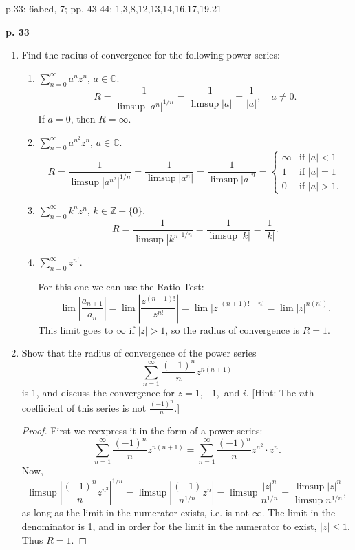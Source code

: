 \documentclass[11pt,oneside,english]{amsart}
\theoremstyle{definition}
\newcommand{\lspace}{\vspace{5mm}}
\newcommand{\MB}[1]{\mathbb{#1}}
\begin{document}
\rightline{\today}

\lspace

p.33: 6abcd, 7; pp. 43-44: 1,3,8,12,13,14,16,17,19,21


\textbf{p. 33}


\begin{enumerate}[leftmargin=*]
\itemsep5mm
\setcounter{enumi}{5}


\item Find the radius of convergence for the following power series:

\begin{enumerate}

\itemsep5mm
\item $\displaystyle \sum_{n=0}^\infty a^nz^n$, $a\in \MB{C}$.
\[
R=\frac{1}{\limsup|a^n|^{1/n}}=\frac{1}{\limsup|a|}=\frac{1}{|a|},\quad a\neq0.
\]
If $a=0$, then $R=\infty$.

\item $\displaystyle \sum_{n=0}^\infty a^{n^2}z^n$, $a\in \MB{C}$.
\[
R=\frac{1}{\limsup|a^{n^2}|^{1/n}}=\frac{1}{\limsup|a^n|}=\frac{1}{\limsup|a|^n}=\begin{cases}\infty & \text{if }|a|<1\\ 1 & \text{if }|a|=1\\ 0 & \text{if }|a|>1.\end{cases}
\]

\item $\displaystyle \sum_{n=0}^\infty k^{n}z^n$, $k\in\MB{Z}-\{0\}$.
\[
R=\frac{1}{\limsup|k^n|^{1/n}}=\frac{1}{\limsup|k|}=\frac{1}{|k|}.
\]

\item $\displaystyle \sum_{n=0}^\infty z^{n!}$.

For this one we can use the Ratio Test:
\[
\lim\left|\frac{a_{n+1}}{a_n}\right|=\lim\left|\frac{z^{(n+1)!}}{z^{n!}}\right|=\lim |z|^{(n+1)!-n!}=\lim |z|^{n(n!)}.
\]
This limit goes to $\infty$ if $|z|>1$, so the radius of convergence is $R=1$.
\end{enumerate}

\pagebreak
\item Show that the radius of convergence of the power series 
\[
\sum_{n=1}^\infty\frac{(-1)^n}{n}z^{n(n+1)}
\]
is 1, and discuss the convergence for $z=1, -1,$ and $i$. [Hint: The $n$th coefficient of this series is not $\frac{(-1)^n}{n}$.]

\begin{proof}
First we reexpress it in the form of a power series:
\[
\sum_{n=1}^\infty\frac{(-1)^n}{n}z^{n(n+1)}=\sum_{n=1}^\infty\frac{(-1)^n}{n}z^{n^2}\cdot z^n.
\]
Now,
\[
\limsup\left|\frac{(-1)^n}{n}z^{n^2}\right|^{1/n}=\limsup\left|\frac{(-1)}{n^{1/n}}z^{n}\right|=\limsup\frac{|z|^n}{n^{1/n}}=\frac{\limsup|z|^n}{\limsup n^{1/n}},
\]
as long as the limit in the numerator exists, i.e. is not $\infty$. The limit in the denominator is 1, and in order for the limit in the numerator to exist, $|z|\leq 1$. Thus $R=1$.
\end{proof}


\end{enumerate}
\end{document}
